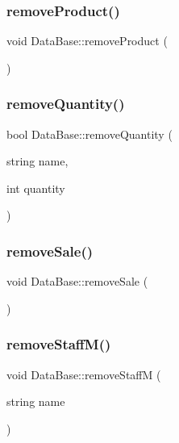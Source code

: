 \subsubsection{\texorpdfstring{remove\+Product()}{removeProduct()}}
{\footnotesize\ttfamily void Data\+Base\+::remove\+Product (\begin{DoxyParamCaption}{ }\end{DoxyParamCaption})}

\mbox{\label{classDataBase_a780ad993953bd70eaee64df86d0f1974}} 
\subsubsection{\texorpdfstring{remove\+Quantity()}{removeQuantity()}}
{\footnotesize\ttfamily bool Data\+Base\+::remove\+Quantity (\begin{DoxyParamCaption}\item[{string}]{name,  }\item[{int}]{quantity }\end{DoxyParamCaption})}

\mbox{\label{classDataBase_adba6b4fad6dcb329aae27d8f610edaac}} 
\subsubsection{\texorpdfstring{remove\+Sale()}{removeSale()}}
{\footnotesize\ttfamily void Data\+Base\+::remove\+Sale (\begin{DoxyParamCaption}{ }\end{DoxyParamCaption})}

\mbox{\label{classDataBase_a79dbf45f9b1a60fd5a29505f44e188e0}} 
\subsubsection{\texorpdfstring{remove\+Staff\+M()}{removeStaffM()}}
{\footnotesize\ttfamily void Data\+Base\+::remove\+StaffM (\begin{DoxyParamCaption}\item[{string}]{name }\end{DoxyParamCaption})}



